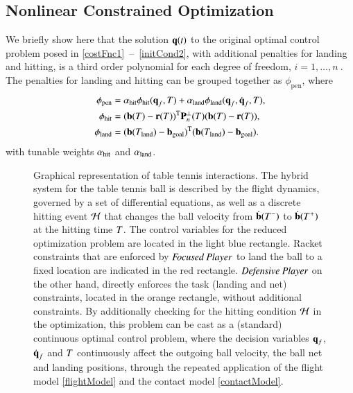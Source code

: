 \subsection{Nonlinear Constrained Optimization}\label{nco2}
%
We briefly show here that the solution $\boldsymbol{\mathrm{q}}(t)$ to the original optimal control problem posed in \mbox{\eqref{costFnc1} -- \eqref{initCond2}}, with additional penalties for landing and hitting, is a third order polynomial for each degree of freedom, $i = 1, \ldots, n \ $. The penalties for landing and hitting can be grouped together as $\phi_{\mathrm{pen}}$, where
%
\begin{align}
\phi_{\mathrm{pen}} &= \alpha_{\mathrm{hit}}\phi_{\mathrm{hit}}(\boldsymbol{\mathrm{q}}_f, T) + \alpha_{\mathrm{land}}\phi_{\mathrm{land}}(\boldsymbol{\mathrm{q}}_f,\dot{\boldsymbol{\mathrm{q}}}_f, T),\\
\phi_{\mathrm{hit}} &= (\boldsymbol{\mathrm{b}}(T) - \boldsymbol{\mathrm{r}}(T))^{\mathrm{T}}\boldsymbol{\mathrm{P}}_{n}^{\perp}(T)(\boldsymbol{\mathrm{b}}(T) - \boldsymbol{\mathrm{r}}(T)), \\ 
\phi_{\mathrm{land}} &= (\boldsymbol{\mathrm{b}}(T_{\mathrm{land}}) - \boldsymbol{\mathrm{b}}_{\mathrm{goal}})^{\mathrm{T}}(\boldsymbol{\mathrm{b}}(T_{\mathrm{land}}) - \boldsymbol{\mathrm{b}}_{\mathrm{goal}}).
\end{align}
%
\noindent with tunable weights $\alpha_{\mathrm{hit}}$ and $\alpha_{\mathrm{land}}$.
%
\begin{figure*}
	\centering
	\def\svgwidth{1.3\columnwidth}
	
	\caption{Graphical representation of table tennis interactions. The hybrid system for the table tennis ball is described by the flight dynamics, governed by a set of differential equations, as well as a discrete hitting event $\mathcal{H}$ that changes the ball velocity from $\dot{\boldsymbol{\mathrm{b}}}(T^{-})$ to $\dot{\boldsymbol{\mathrm{b}}}(T^{+})$ at the hitting time $T$. The control variables for the reduced optimization problem are located in the light blue rectangle. Racket constraints that are enforced by $\emph{Focused Player}$ to land the ball to a fixed location are indicated in the red rectangle. $\emph{Defensive Player}$ on the other hand, directly enforces the task (landing and net) constraints, located in the orange rectangle, without additional constraints. By additionally checking for the hitting condition $\mathcal{H}$ in the optimization, this problem can be cast as a (standard) continuous optimal control problem, where the decision variables $\boldsymbol{\mathrm{q}}_f$, $\dot{\boldsymbol{\mathrm{q}}}_f$ and $T$ continuously affect the outgoing ball velocity, the ball net and landing positions, through the repeated application of the flight model \eqref{flightModel} and the contact model \eqref{contactModel}.} 
	\label{graphTT}
\end{figure*}
%
